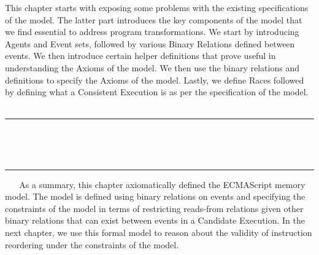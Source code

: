 This chapter starts with exposing some problems with the existing specifications of the model. 
The latter part introduces the key components of the model that we find essential to address program transformations. 
We start by introducing Agents and Event sets, followed by various Binary Relations defined between events. 
We then introduce certain helper definitions that prove useful in understanding the Axioms of the model. 
We then use the binary relations and definitions to specify the Axioms of the model.
Lastly, we define Races followed by defining what a Consistent Execution is as per the specification of the model.  
\ \newline
\ \newline  
\hrule 
\ \newline 
\ \newline 



















\ \newline
\ \newline  
\hrule 
\ \newline 
\ \newline 
As a summary, this chapter axiomatically defined the ECMAScript memory model. 
The model is defined using binary relations on events and specifying the constraints of the model in terms of restricting reads-from relations given other binary relations that can exist between events in a Candidate Execution.
In the next chapter, we use this formal model to reason about the validity of instruction reordering under the constraints of the model.